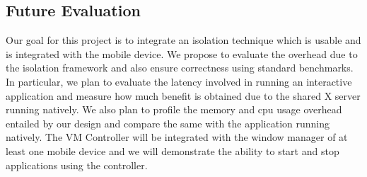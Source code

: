\subsection{Future Evaluation}

Our goal for this project is to integrate an isolation technique which is usable and is integrated with the mobile device. We propose to evaluate the overhead due to the isolation framework and also ensure correctness using standard benchmarks. In particular, we plan to evaluate the latency involved in running an interactive application and measure how much benefit is obtained due to the shared X server running natively. We also plan to profile the memory and cpu usage overhead entailed by our design and compare the same with the application running natively. The VM Controller will be integrated with the window manager of at least one mobile device and we will demonstrate the ability to start and stop applications using the controller.

